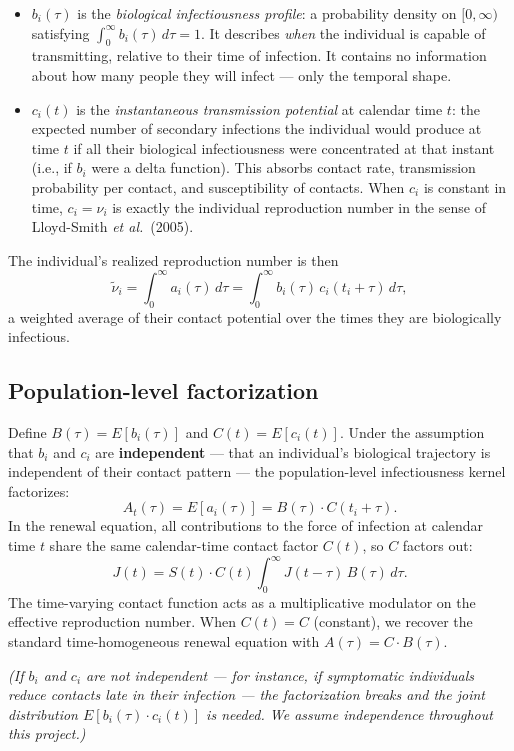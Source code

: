 \documentclass[11pt]{article}
\begin{document}
\begin{itemize}
\item \textbf{$b_i(\tau)$} is the \textit{biological infectiousness profile}: a probability density on $[0, \infty)$ satisfying $\int_0^\infty b_i(\tau)\,d\tau = 1$. It describes \textit{when} the individual is capable of transmitting, relative to their time of infection. It contains no information about how many people they will infect --- only the temporal shape.

\item \textbf{$c_i(t)$} is the \textit{instantaneous transmission potential} at calendar time $t$: the expected number of secondary infections the individual would produce at time $t$ if all their biological infectiousness were concentrated at that instant (i.e., if $b_i$ were a delta function). This absorbs contact rate, transmission probability per contact, and susceptibility of contacts. When $c_i$ is constant in time, $c_i = \nu_i$ is exactly the individual reproduction number in the sense of Lloyd-Smith \textit{et al.}\ (2005).
\end{itemize}

The individual's realized reproduction number is then
\[
\tilde{\nu}_i = \int_0^\infty a_i(\tau)\,d\tau = \int_0^\infty b_i(\tau)\,c_i(t_i + \tau)\,d\tau,
\]
a weighted average of their contact potential over the times they are biologically infectious.

\subsection{Population-level factorization}

Define $B(\tau) = E[b_i(\tau)]$ and $C(t) = E[c_i(t)]$. Under the assumption that $b_i$ and $c_i$ are \textbf{independent} --- that an individual's biological trajectory is independent of their contact pattern --- the population-level infectiousness kernel factorizes:
\[
A_t(\tau) = E[a_i(\tau)] = B(\tau) \cdot C(t_i + \tau).
\]
In the renewal equation, all contributions to the force of infection at calendar time $t$ share the same calendar-time contact factor $C(t)$, so $C$ factors out:
\[
J(t) = S(t) \cdot C(t) \int_0^\infty J(t - \tau)\,B(\tau)\,d\tau.
\]
The time-varying contact function acts as a multiplicative modulator on the effective reproduction number. When $C(t) = C$ (constant), we recover the standard time-homogeneous renewal equation with $A(\tau) = C \cdot B(\tau)$.

\textit{(If $b_i$ and $c_i$ are not independent --- for instance, if symptomatic individuals reduce contacts late in their infection --- the factorization breaks and the joint distribution $E[b_i(\tau) \cdot c_i(t)]$ is needed. We assume independence throughout this project.)}
\end{document}

